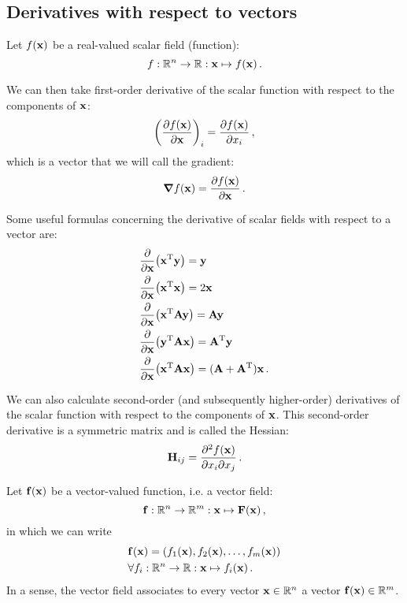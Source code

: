 \subsection{Derivatives with respect to vectors}
    Let $f(\vb{x})$ be a real-valued scalar field (function):
    \begin{equation}
        f: \mathbb{R}^n \rightarrow \mathbb{R}: \vb{x} \mapsto f(\vb{x}) \thinspace .
    \end{equation}

    We can then take first-order derivative of the scalar function with respect to the components of $\vb{x}$:
    \begin{equation}
        \qty(\pdv{f(\vb{x})}{\vb{x}})_i = \pdv{f(\vb{x})}{x_i} \thinspace ,
    \end{equation}
    which is a vector that we will call the gradient:
    \begin{equation}
        \grad{f(\vb{x})} = \pdv{f(\vb{x})}{\vb{x}} \thinspace .
    \end{equation}

    Some useful formulas concerning the derivative of scalar fields with respect to a vector are:
    \begin{align}
        & \pdv{\vb{x}} (\vb{x}^\text{T} \vb{y}) = \vb{y} \\
        & \pdv{\vb{x}} (\vb{x}^\text{T} \vb{x}) = 2 \vb{x} \\
        & \pdv{\vb{x}} (\vb{x}^\text{T} \vb{A} \vb{y}) = \vb{A} \vb{y} \\
        & \pdv{\vb{x}} (\vb{y}^\text{T} \vb{A} \vb{x}) = \vb{A}^\text{T} \vb{y} \\
        & \pdv{\vb{x}} (\vb{x}^\text{T} \vb{A} \vb{x}) = (\vb{A} + \vb{A}^\text{T}) \vb{x} \thinspace .
    \end{align}

    We can also calculate second-order (and subsequently higher-order) derivatives of the scalar function with respect to the components of $\vb{x}$. This second-order derivative is a symmetric matrix and is called the Hessian:
    \begin{equation}
        \vb{H}_{ij} = \pdv{f(\vb{x})}{x_i}{x_j} \thinspace .
    \end{equation}

    Let $\vb{f}(\vb{x})$ be a vector-valued function, i.e. a vector field:
    \begin{equation}
        \vb{f}: \mathbb{R}^n \rightarrow \mathbb{R}^m: \vb{x} \mapsto \vb{F}(\vb{x}) \thinspace ,
    \end{equation}
    in which we can write
    \begin{align}
        &\vb{f}(\vb{x}) = (f_1(\vb{x}), f_2(\vb{x}), \dots, f_m(\vb{x})) \\
        &\forall f_i: \mathbb{R}^n \rightarrow \mathbb{R}: \vb{x} \mapsto f_i(\vb{x}) \thinspace .
    \end{align}
    In a sense, the vector field associates to every vector $\vb{x} \in \mathbb{R}^n$ a vector $\vb{f}(\vb{x}) \in \mathbb{R}^m$.

